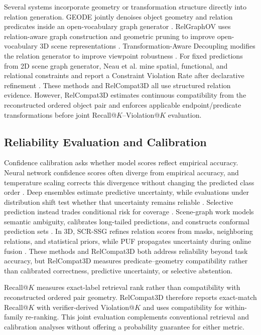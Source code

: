 Several systems incorporate geometry or transformation structure directly into relation generation. GEODE jointly denoises object geometry and relation predicates inside an open-vocabulary graph generator \cite{feng2026geode}. RelGraphOV uses relation-aware graph construction and geometric pruning to improve open-vocabulary 3D scene representations \cite{chen2026beyond}. Transformation-Aware Decoupling modifies the relation generator to improve viewpoint robustness \cite{sun2026not}. For fixed predictions from 2D scene graph generator, Neau et al. mine spatial, functional, and relational constraints and report a Constraint Violation Rate after declarative refinement \cite{neau2026visual}. These methods and RelCompat3D all use structured relation evidence. However, RelCompat3D estimates continuous compatibility from the reconstructed ordered object pair and enforces applicable endpoint/predicate transformations before joint Recall@$K$--Violation@$K$ evaluation. 

\subsection{Reliability Evaluation and Calibration}
Confidence calibration asks whether model scores reflect empirical accuracy. Neural network confidence scores often diverge from empirical accuracy, and temperature scaling corrects this divergence without changing the predicted class order \cite{guo2017calibration}. Deep ensembles estimate predictive uncertainty, while evaluations under distribution shift test whether that uncertainty remains reliable \cite{lakshminarayanan2017simple,ovadia2019can}. Selective prediction instead trades conditional risk for coverage \cite{geifman2017selective}. Scene-graph work models semantic ambiguity, calibrates long-tailed predictions, and constructs conformal prediction sets \cite{yang2021probabilistic,zhu2024calibration,nag2025conformal}. In 3D, SCR-SSG refines relation scores from masks, neighboring relations, and statistical priors, while PUF propagates uncertainty during online fusion \cite{yeo2025statistical,yang2026puf}. These methods and RelCompat3D both address reliability beyond task accuracy, but RelCompat3D measures predicate--geometry compatibility rather than calibrated correctness, predictive uncertainty, or selective abstention.

Recall@$K$ measures exact-label retrieval rank rather than compatibility with reconstructed ordered pair geometry. RelCompat3D therefore reports exact-match Recall@$K$ with verifier-derived Violation@$K$ and uses compatibility for within-family re-ranking. This joint evaluation complements conventional retrieval and calibration analyses without offering a probability guarantee for either metric.


